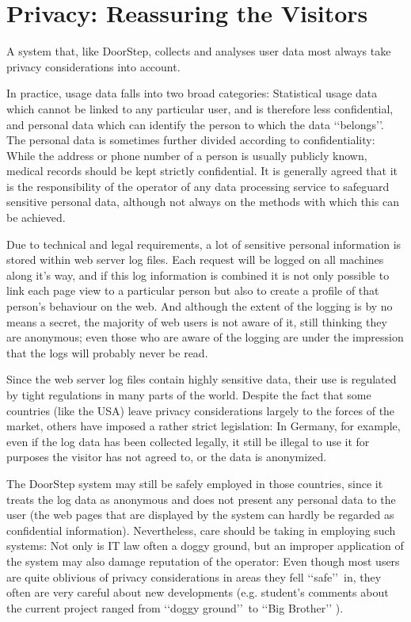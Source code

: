 \documentclass[a4paper]{danarticle}
\theoremstyle{remark}
\begin{document}
  \section{Privacy: Reassuring the Visitors}
    A system that, like DoorStep, collects and analyses user data most always 
    take privacy considerations into account. 
    
    In practice, usage data falls into two broad categories: Statistical usage 
    data which cannot be linked to any particular user, and is therefore less 
    confidential, and personal data which can identify the 
    person to which the data \lq\lq belongs\rq\rq . The personal data is 
    sometimes further divided according to confidentiality: While the address or 
    phone number of a person is usually publicly known, medical records should 
    be kept strictly confidential. It is generally agreed that it is the 
    responsibility of the operator of any data processing service to safeguard 
    sensitive personal data, although not always on the methods with which this 
    can be achieved. 
    
    Due to technical and legal requirements, a lot of sensitive personal 
    information is stored within web server log files. Each request will be 
    logged on all machines along it's way, and if this log information is 
    combined it is not only possible to link each page view to a particular 
    person but also to create a profile of that person's behaviour on the web. 
    And although the extent of the logging is by no means a secret, the majority 
    of web users is not aware of it, still thinking they are anonymous; even 
    those who are aware of the logging are under the impression that the logs 
    will probably never be read.
    
    Since the web server log files contain highly sensitive data, their use is 
    regulated by tight regulations in many parts of the world. Despite the fact 
    that some countries (like the USA) leave privacy considerations largely to 
    the forces of the market, others have imposed a rather strict legislation: 
    In Germany, for example, even if the log data has been collected legally, it 
    still be illegal to use it for purposes the visitor has not agreed to, or 
    the data is anonymized.
    
    The DoorStep system may still be safely employed in those countries, since 
    it treats the log data as anonymous and does not present any personal data 
    to the user (the web pages that are displayed by the system can hardly be 
    regarded as confidential information). Nevertheless, care should be taking 
    in employing such systems: Not only is IT law often a doggy ground, but an 
    improper application of the system may also damage reputation of the 
    operator: Even though most users are quite oblivious of privacy 
    considerations in areas they fell \lq\lq safe\rq\rq\ in, they often are very 
    careful about new developments (e.g. student's comments about the current 
    project ranged from \lq\lq doggy ground\rq\rq\ to \lq\lq Big Brother\rq\rq 
    ).
    
\end{document}
